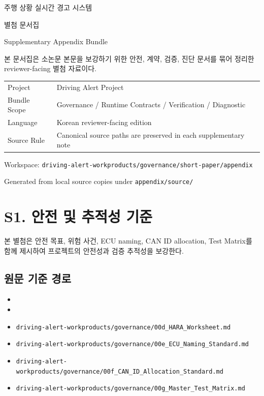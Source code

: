 \documentclass[8pt,a4paper]{article}
\begin{document}
\begin{titlepage}
\centering
{\Large 주행 상황 실시간 경고 시스템 \par}
\vspace{0.5em}
{\LARGE 별첨 문서집 \par}
\vspace{0.8em}
{\large Supplementary Appendix Bundle \par}
\vspace{1.6em}
{\normalsize 본 문서집은 소논문 본문을 보강하기 위한 안전, 계약, 검증, 진단 문서를 묶어 정리한 reviewer-facing 별첨 자료이다. \par}
\vspace{1.2em}
\begin{tabular}{ll}
Project & Driving Alert Project \\
Bundle Scope & Governance / Runtime Contracts / Verification / Diagnostic \\
Language & Korean reviewer-facing edition \\
Source Rule & Canonical source paths are preserved in each supplementary note \\
\end{tabular}
\vfill
{\normalsize Workspace: \texttt{driving-alert-workproducts/governance/short-paper/appendix} \par}
\vspace{0.4em}
{\normalsize Generated from local source copies under \texttt{appendix/source/} \par}
\end{titlepage}

\tableofcontents
\clearpage

\section*{S1. 안전 및 추적성 기준}
본 별첨은 안전 목표, 위험 사건, ECU naming, CAN ID allocation, Test Matrix를 함께 제시하여 프로젝트의 안전성과 검증 추적성을 보강한다.

\subsection*{원문 기준 경로}
\begin{itemize}
\item {}
\item {}
\item \texttt{driving-alert-workproducts/governance/00d\_HARA\_Worksheet.md}
\item \texttt{driving-alert-workproducts/governance/00e\_ECU\_Naming\_Standard.md}
\item \texttt{driving-alert-workproducts/governance/00f\_CAN\_ID\_Allocation\_Standard.md}
\item \texttt{driving-alert-workproducts/governance/00g\_Master\_Test\_Matrix.md}
\end{itemize}
\end{document}
